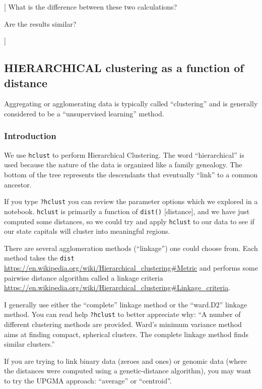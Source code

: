 \documentclass[
]{article}
\begin{document}
{[} What is the difference between these two calculations?

Are the results similar?

{]}

\hypertarget{hierarchical-clustering-as-a-function-of-distance}{%
\subsection{HIERARCHICAL clustering as a function of
distance}\label{hierarchical-clustering-as-a-function-of-distance}}

Aggregating or agglomerating data is typically called ``clustering'' and
is generally considered to be a ``unsupervised learning'' method.

\hypertarget{introduction-1}{%
\subsubsection{Introduction}\label{introduction-1}}

We use \texttt{hclust} to perform Hierarchical Clustering. The word
``hierarchical'' is used because the nature of the data is organized
like a family genealogy. The bottom of the tree represents the
descendants that eventually ``link'' to a common ancestor.

If you type \texttt{?hclust} you can review the parameter options which
we explored in a notebook. \texttt{hclust} is primarily a function of
\texttt{dist()} {[}distance{]}, and we have just computed some
distances, so we could try and apply \texttt{hclust} to our data to see
if our state capitals will cluster into meaningful regions.

There are several agglomeration methods (``linkage'') one could choose
from. Each method takes the \texttt{dist}
\url{https://en.wikipedia.org/wiki/Hierarchical_clustering\#Metric} and
performs some pairwise distance algorithm called a linkage criteria
\url{https://en.wikipedia.org/wiki/Hierarchical_clustering\#Linkage_criteria}.

I generally use either the ``complete'' linkage method or the
``ward.D2'' linkage method. You can read help \texttt{?hclust} to better
appreciate why: ``A number of different clustering methods are provided.
Ward's minimum variance method aims at finding compact, spherical
clusters. The complete linkage method finds similar clusters.''

If you are trying to link binary data (zeroes and ones) or genomic data
(where the distances were computed using a genetic-distance algorithm),
you may want to try the UPGMA approach: ``average'' or ``centroid''.
\end{document}
